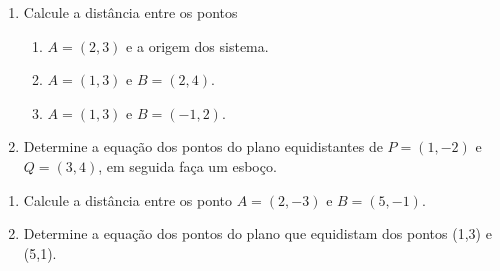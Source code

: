\begin{frame}[label=circulo]{}

\begin{exe}
\begin{enumerate}
\item Calcule a distância entre os pontos
\begin{enumerate}[a]
\item \(A=(2,3)\) e a origem dos sistema.
\item  \(A=(1,3)\) e \(B=(2,4)\).
\item  \(A=(1,3)\) e \(B=(-1,2)\).
\end{enumerate}
\item Determine a equação dos pontos do plano equidistantes de \(P=(1,-2)\) e \(Q=(3,4)\), em seguida faça um esboço.
 \end{enumerate}
\end{exe}
\end{frame}


\begin{frame}[label=circulo]
\begin{casa}
\begin{enumerate}
\item Calcule a distância entre os ponto \(A=(2,-3)\) e \(B=(5,-1)\).
\item Determine a equação dos pontos do plano que equidistam dos pontos (1,3) e (5,1).
\end{enumerate}
\end{casa}

\end{frame}

